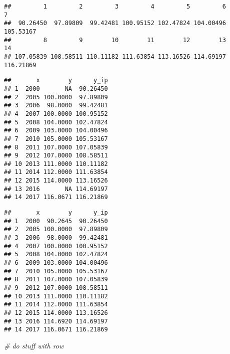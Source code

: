 \documentclass[]{article}
\newenvironment{Shaded}{\begin{snugshade}}{\end{snugshade}}
\newcommand{\KeywordTok}[1]{\textcolor[rgb]{0.13,0.29,0.53}{\textbf{#1}}}
\newcommand{\DataTypeTok}[1]{\textcolor[rgb]{0.13,0.29,0.53}{#1}}
\newcommand{\StringTok}[1]{\textcolor[rgb]{0.31,0.60,0.02}{#1}}
\newcommand{\CommentTok}[1]{\textcolor[rgb]{0.56,0.35,0.01}{\textit{#1}}}
\newcommand{\OperatorTok}[1]{\textcolor[rgb]{0.81,0.36,0.00}{\textbf{#1}}}
\newcommand{\NormalTok}[1]{#1}
\begin{document}
\begin{verbatim}
##         1         2         3         4         5         6         7 
##  90.26450  97.89809  99.42481 100.95152 102.47824 104.00496 105.53167 
##         8         9        10        11        12        13        14 
## 107.05839 108.58511 110.11182 111.63854 113.16526 114.69197 116.21869
\end{verbatim}

\begin{Shaded}
\end{Shaded}

\begin{verbatim}
##       x        y      y_ip
## 1  2000       NA  90.26450
## 2  2005 100.0000  97.89809
## 3  2006  98.0000  99.42481
## 4  2007 100.0000 100.95152
## 5  2008 104.0000 102.47824
## 6  2009 103.0000 104.00496
## 7  2010 105.0000 105.53167
## 8  2011 107.0000 107.05839
## 9  2012 107.0000 108.58511
## 10 2013 111.0000 110.11182
## 11 2014 112.0000 111.63854
## 12 2015 114.0000 113.16526
## 13 2016       NA 114.69197
## 14 2017 116.0671 116.21869
\end{verbatim}

\begin{Shaded}
\end{Shaded}

\begin{verbatim}
##       x        y      y_ip
## 1  2000  90.2645  90.26450
## 2  2005 100.0000  97.89809
## 3  2006  98.0000  99.42481
## 4  2007 100.0000 100.95152
## 5  2008 104.0000 102.47824
## 6  2009 103.0000 104.00496
## 7  2010 105.0000 105.53167
## 8  2011 107.0000 107.05839
## 9  2012 107.0000 108.58511
## 10 2013 111.0000 110.11182
## 11 2014 112.0000 111.63854
## 12 2015 114.0000 113.16526
## 13 2016 114.6920 114.69197
## 14 2017 116.0671 116.21869
\end{verbatim}

\begin{Shaded}
\begin{Highlighting}[]
\CommentTok{# do stuff with row}
\end{Highlighting}
\end{Shaded}
\end{document}
